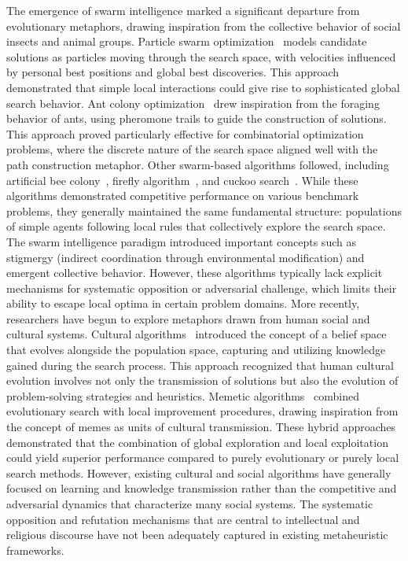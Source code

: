 \documentclass[11pt]{article}
\begin{document}
The emergence of swarm intelligence marked a significant departure from evolutionary metaphors, drawing inspiration from the collective behavior of social insects and animal groups. Particle swarm optimization~\citep{kennedy1995particle} models candidate solutions as particles moving through the search space, with velocities influenced by personal best positions and global best discoveries. This approach demonstrated that simple local interactions could give rise to sophisticated global search behavior.
Ant colony optimization~\citep{dorigo1996ant} drew inspiration from the foraging behavior of ants, using pheromone trails to guide the construction of solutions. This approach proved particularly effective for combinatorial optimization problems, where the discrete nature of the search space aligned well with the path construction metaphor.
Other swarm-based algorithms followed, including artificial bee colony~\citep{karaboga2005idea}, firefly algorithm~\citep{yang2008firefly}, and cuckoo search~\citep{yang2009cuckoo}. While these algorithms demonstrated competitive performance on various benchmark problems, they generally maintained the same fundamental structure: populations of simple agents following local rules that collectively explore the search space.
The swarm intelligence paradigm introduced important concepts such as stigmergy (indirect coordination through environmental modification) and emergent collective behavior. However, these algorithms typically lack explicit mechanisms for systematic opposition or adversarial challenge, which limits their ability to escape local optima in certain problem domains.
More recently, researchers have begun to explore metaphors drawn from human social and cultural systems. Cultural algorithms~\citep{reynolds1994introduction} introduced the concept of a belief space that evolves alongside the population space, capturing and utilizing knowledge gained during the search process. This approach recognized that human cultural evolution involves not only the transmission of solutions but also the evolution of problem-solving strategies and heuristics.
Memetic algorithms~\citep{moscato1989evolution} combined evolutionary search with local improvement procedures, drawing inspiration from the concept of memes as units of cultural transmission. These hybrid approaches demonstrated that the combination of global exploration and local exploitation could yield superior performance compared to purely evolutionary or purely local search methods.
However, existing cultural and social algorithms have generally focused on learning and knowledge transmission rather than the competitive and adversarial dynamics that characterize many social systems. The systematic opposition and refutation mechanisms that are central to intellectual and religious discourse have not been adequately captured in existing metaheuristic frameworks.
\end{document}
